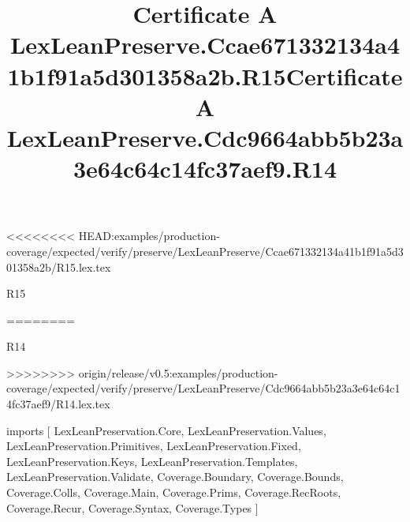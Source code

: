 <<<<<<<< HEAD:examples/production-coverage/expected/verify/preserve/LexLeanPreserve/Ccae671332134a41b1f91a5d301358a2b/R15.lex.tex
\begin{lexlean}{R15}
\title{Certificate A LexLeanPreserve.Ccae671332134a41b1f91a5d301358a2b.R15}
========
\begin{lexlean}{R14}
\title{Certificate A LexLeanPreserve.Cdc9664abb5b23a3e64c64c14fc37aef9.R14}
>>>>>>>> origin/release/v0.5:examples/production-coverage/expected/verify/preserve/LexLeanPreserve/Cdc9664abb5b23a3e64c64c14fc37aef9/R14.lex.tex
\begin{coremodule}
imports [
  LexLeanPreservation.Core,
  LexLeanPreservation.Values,
  LexLeanPreservation.Primitives,
  LexLeanPreservation.Fixed,
  LexLeanPreservation.Keys,
  LexLeanPreservation.Templates,
  LexLeanPreservation.Validate,
  Coverage.Boundary,
  Coverage.Bounds,
  Coverage.Colls,
  Coverage.Main,
  Coverage.Prims,
  Coverage.RecRoots,
  Coverage.Recur,
  Coverage.Syntax,
  Coverage.Types
]


\end{coremodule}
\end{lexlean}
\end{lexlean}
